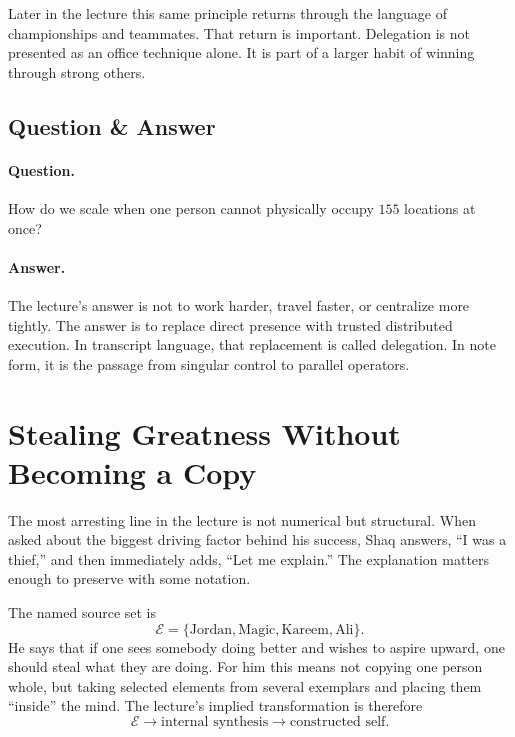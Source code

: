 Later in the lecture this same principle returns through the language of championships and teammates. That return is important. Delegation is not presented as an office technique alone. It is part of a larger habit of winning through strong others.

\subsection{Question \& Answer}

\paragraph{Question.} How do we scale when one person cannot physically occupy \(155\) locations at once?

\paragraph{Answer.} The lecture's answer is not to work harder, travel faster, or centralize more tightly. The answer is to replace direct presence with trusted distributed execution. In transcript language, that replacement is called delegation. In note form, it is the passage from singular control to parallel operators.

\section{Stealing Greatness Without Becoming a Copy}

The most arresting line in the lecture is not numerical but structural. When asked about the biggest driving factor behind his success, Shaq answers, ``I was a thief,'' and then immediately adds, ``Let me explain.'' The explanation matters enough to preserve with some notation.

The named source set is
\begin{equation}
\mathcal{E}=\{\text{Jordan},\text{Magic},\text{Kareem},\text{Ali}\}.
\end{equation}
He says that if one sees somebody doing better and wishes to aspire upward, one should steal what they are doing. For him this means not copying one person whole, but taking selected elements from several exemplars and placing them ``inside'' the mind. The lecture's implied transformation is therefore
\begin{equation}
\mathcal{E} \to \text{internal synthesis} \to \text{constructed self}.
\end{equation}

